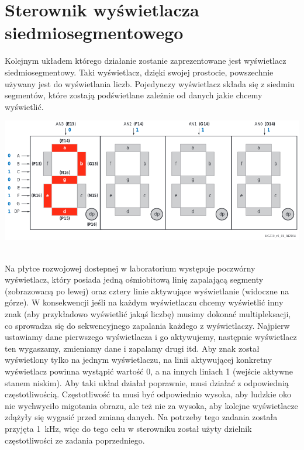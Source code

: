 \documentclass[12pt]{article}
\begin{document}
\section{Sterownik wyświetlacza siedmiosegmentowego}
Kolejnym układem którego działanie zostanie zaprezentowane jest wyświetlacz siedmiosegmentowy. Taki wyświetlacz, dzięki swojej prostocie, powszechnie używany jest do wyświetlania liczb. Pojedynczy wyświetlacz składa się z siedmiu segmentów, które zostają podświetlane zależnie od danych jakie chcemy wyświetlić.\\
\centerline{\includegraphics[width=1\linewidth]{3_1.png}}\\
Na płytce rozwojowej dostepnej w laboratorium występuje poczwórny wyświetlacz, który posiada jedną ośmiobitową linię zapalającą segmenty (zobrazowaną po lewej) oraz cztery linie aktywujące wyświetlanie (widoczne na górze). W konsekwencji jeśli na każdym wyświetlaczu chcemy wyświetlić inny znak (aby przykładowo wyświetlić jakąś liczbę) musimy dokonać multipleksacji, co sprowadza się do sekwencyjnego zapalania każdego z wyświetlaczy. Najpierw ustawiamy dane pierwszego wyświetlacza i go aktywujemy, następnie wyświetlacz ten wygaszamy, zmieniamy dane i zapalamy drugi itd. Aby znak został wyświetlony tylko na jednym wyświetlaczu, na linii aktywującej konkretny wyświetlacz powinna wystąpić wartość 0, a na innych liniach 1 (wejście aktywne stanem niskim). Aby taki układ działał poprawnie, musi działać z odpowiednią częstotliwością. Częstotliwość ta musi być odpowiednio wysoka, aby ludzkie oko nie wychwyciło migotania obrazu, ale też nie za wysoka, aby kolejne wyświetlacze zdążyły się wygasić przed zmianą danych. Na potrzeby tego zadania została przyjęta 1~kHz, więc do tego celu w sterowniku został użyty dzielnik częstotliwości ze zadania poprzedniego.
\end{document}
